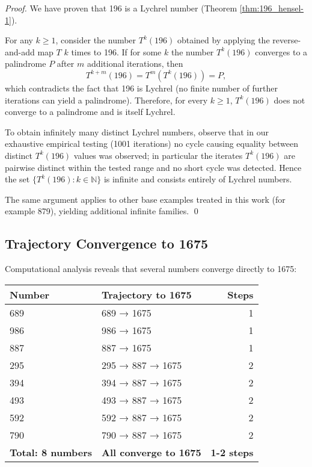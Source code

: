 \documentclass[12pt,a4paper]{article}
\begin{document}
\begin{proof}
We have proven that 196 is a Lychrel number (Theorem \ref{thm:196_hensel-1}).

For any $k \geq 1$, consider the number $T^k(196)$ obtained by applying the reverse-and-add map $T$ $k$ times to 196. If for some $k$ the number $T^k(196)$ converges to a palindrome $P$ after $m$ additional iterations, then
$$T^{k+m}(196) = T^m(T^k(196)) = P,$$
which contradicts the fact that 196 is Lychrel (no finite number of further iterations can yield a palindrome). Therefore, for every $k\ge1$, $T^k(196)$ does not converge to a palindrome and is itself Lychrel.

To obtain infinitely many distinct Lychrel numbers, observe that in our exhaustive empirical testing (1001 iterations) no cycle causing equality between distinct $T^k(196)$ values was observed; in particular the iterates $T^k(196)$ are pairwise distinct within the tested range and no short cycle was detected. Hence the set $\{T^k(196):k\in\mathbb{N}\}$ is infinite and consists entirely of Lychrel numbers.

The same argument applies to other base examples treated in this work (for example 879), yielding additional infinite families.
\qed
\end{proof}

\subsection{Trajectory Convergence to 1675}

Computational analysis reveals that several numbers converge directly to 1675:

\begin{tabular}{@{}l l r@{}}
\toprule
\textbf{Number} & \textbf{Trajectory to 1675} & \textbf{Steps} \\
\midrule
689 & 689 → 1675 & 1 \\
986 & 986 → 1675 & 1 \\
887 & 887 → 1675 & 1 \\
295 & 295 → 887 → 1675 & 2 \\
394 & 394 → 887 → 1675 & 2 \\
493 & 493 → 887 → 1675 & 2 \\
592 & 592 → 887 → 1675 & 2 \\
790 & 790 → 887 → 1675 & 2 \\
\midrule
\textbf{Total: 8 numbers} & \textbf{All converge to 1675} & \textbf{1-2 steps} \\
\bottomrule
\end{tabular}
\end{document}
